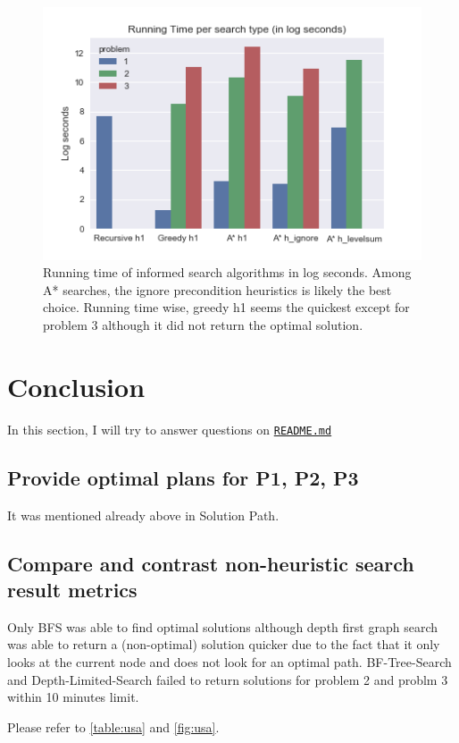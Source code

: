 \documentclass[letterpaper]{article}
\begin{document}
\begin{figure}[!ht]
\includegraphics[scale=1]{assets/informed_search.png}
\caption{Running time of informed search algorithms in log seconds. Among A* searches, the ignore precondition heuristics is likely the best choice. Running time wise, greedy h1 seems the quickest except for problem 3 although it did not return the optimal solution.}
\label{fig:informed}
\end{figure}

\newpage\phantom{ss}
\section{Conclusion}
In this section, I will try to answer questions on \href{https://github.com/udacity/AIND-Planning}{\texttt{README.md}}

\subsection*{Provide optimal plans for P1, P2, P3}
It was mentioned already above in Solution Path.

\subsection*{Compare and contrast non-heuristic search result metrics}
Only BFS was able to find optimal solutions although depth first graph search was able to return a (non-optimal) solution quicker due to the fact that it only looks at the current node and does not look for an optimal path.
BF-Tree-Search and Depth-Limited-Search failed to return solutions for problem 2 and problm 3 within 10 minutes limit.

Please refer to \autoref{table:usa} and \autoref{fig:usa}.
\end{document}
